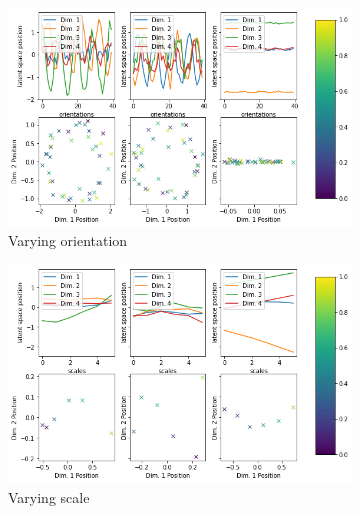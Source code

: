 \begin{figure}
\begin{subfigure}{.48\textwidth}
    \end{subfigure}
    \vfill
    \begin{subfigure}{.48\textwidth}
        \centering
        \includegraphics[width=\textwidth]{images/latent_space_traversals/vlae_dsprites_orientation_latent_space_values.png}
        \caption{Varying orientation}
        \label{subfig:vlae_dsprites_latent_space_values_orientation}
    \end{subfigure}
    \hfill
    \begin{subfigure}{.48\textwidth}
        \centering
        \includegraphics[width=\textwidth]{images/latent_space_traversals/vlae_dsprites_scale_latent_space_values.png}
        \caption{Varying scale}
        \label{subfig:vlae_dsprites_latent_space_values_scale}
    \end{subfigure}
    \vfill
    \begin{subfigure}{.48\textwidth}
        \centering

\end{subfigure}
\end{figure}
